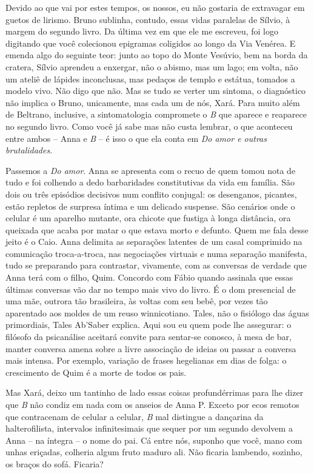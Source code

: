 Devido ao que vai por estes tempos, os nossos, eu não gostaria de
extravagar em guetos de lirismo. Bruno sublinha, contudo, essas vidas
paralelas de Sílvio, à margem do segundo livro. Da última vez em que ele
me escreveu, foi logo digitando que você colecionou epigramas coligidos
ao longo da Via Venérea. E emenda algo do seguinte teor: junto ao topo
do Monte Vesúvio, bem na borda da cratera, Sílvio aprendeu a enxergar,
não o abismo, mas um lago; em volta, não um ateliê de lápides
inconclusas, mas pedaços de templo e estátua, tomados a modelo vivo. Não
digo que não. Mas se tudo se verter um sintoma, o diagnóstico não
implica o Bruno, unicamente, mas cada um de nós, Xará. Para muito além
de Beltrano, inclusive, a sintomatologia compromete o \emph{B} que
aparece e reaparece no segundo livro. Como você já sabe mas não custa
lembrar, o que aconteceu entre ambos -- Anna e \emph{B} -- é isso o que
ela conta em \emph{Do amor e outras brutalidades}.

Passemos a \emph{Do amor}. Anna se apresenta com o recuo de quem tomou
nota de tudo e foi colhendo a dedo barbaridades constitutivas da vida em
família. São dois ou três episódios decisivos num conflito conjugal: os
desenganos, picantes, estão repletos de surpresa íntima e um delicado
suspense. São cenários onde o celular é um aparelho mutante, ora chicote
que fustiga à longa distância, ora queixada que acaba por matar o que
estava morto e defunto. Quem me fala desse jeito é o Caio. Anna delimita
as separações latentes de um casal comprimido na comunicação
troca-a-troca, nas negociações virtuais e numa separação manifesta, tudo
se preparando para contrastar, vivamente, com as conversas de verdade
que Anna terá com o filho, Quim. Concordo com Fábio quando assinala que
essas últimas conversas vão dar no tempo mais vivo do livro. É o dom
presencial de uma mãe, outrora tão brasileira, às voltas com seu bebê,
por vezes tão aparentado aos moldes de um reuso winnicotiano. Tales, não
o fisiólogo das águas primordiais, Tales Ab'Saber explica. Aqui sou eu
quem pode lhe assegurar: o filósofo da psicanálise aceitará convite para
sentar-se conosco, à mesa de bar, manter conversa amena sobre a livre
associação de ideias ou passar a conversa mais intensa. Por exemplo,
variação de frases hegelianas em dias de folga: o crescimento de Quim é
a morte de todos os pais.

Mas Xará, deixo um tantinho de lado essas coisas profundérrimas para lhe
dizer que \emph{B} não condiz em nada com os anseios de Anna P. Exceto
por ecos remotos que contracenam de celular a celular, \emph{B} mal
distingue a dançarina da halterofilista, intervalos infinitesimais que
sequer por um segundo devolvem a Anna -- na íntegra -- o nome do pai. Cá
entre nós, suponho que você, mano com unhas eriçadas, colheria algum
fruto maduro ali. Não ficaria lambendo, sozinho, os braços do sofá.
Ficaria?

